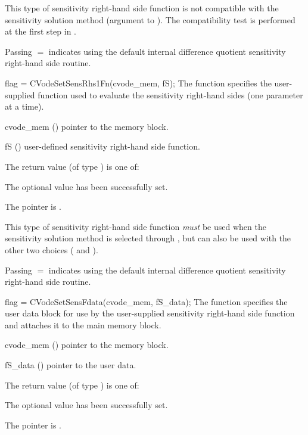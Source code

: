 {
  This type of sensitivity right-hand side function is not compatible
  with the  sensitivity solution method (argument 
  to ). The compatibility test is performed at the first
  step in .

  Passing $=$ indicates using the default internal difference 
  quotient sensitivity right-hand side routine.
}
{
  flag = CVodeSetSensRhs1Fn(cvode\_mem, fS);
}
{
  The function  specifies the user-supplied {\C} function
  used to evaluate the sensitivity right-hand sides (one parameter at a time).
}
{
  \begin{args}
  \item[cvode\_mem] ()
    pointer to the {\cvodes} memory block.
  \item[fS] ()
    user-defined sensitivity right-hand side function.
  \end{args}
}
{
  The return value  (of type ) is one of:
  \begin{args}
  \item[\Id{CV\_SUCCESS}] 
    The optional value has been successfully set.
  \item[\Id{CV\_MEM\_NULL}]
    The  pointer is .
  \end{args}
}
{
  This type of sensitivity right-hand side function {\em must} be used when
  the  sensitivity solution method is selected through
  , but can also be used with the other two choices
  ( and ).

  Passing $=$ indicates using the default internal difference 
  quotient sensitivity right-hand side routine.
}
{
  flag = CVodeSetSensFdata(cvode\_mem, fS\_data);
}
{
  The function  specifies the user data block 
  for use by the user-supplied sensitivity right-hand side function and attaches 
  it to the main {\cvodes} memory block.
}
{
  \begin{args}
  \item[cvode\_mem] ()
    pointer to the {\cvodes} memory block.
  \item[fS\_data] ()
    pointer to the user data.
  \end{args}
}
{
  The return value  (of type ) is one of:
  \begin{args}
  \item[\Id{CV\_SUCCESS}] 
    The optional value has been successfully set.
  \item[\Id{CV\_MEM\_NULL}]
    The  pointer is .
  \end{args}
}
